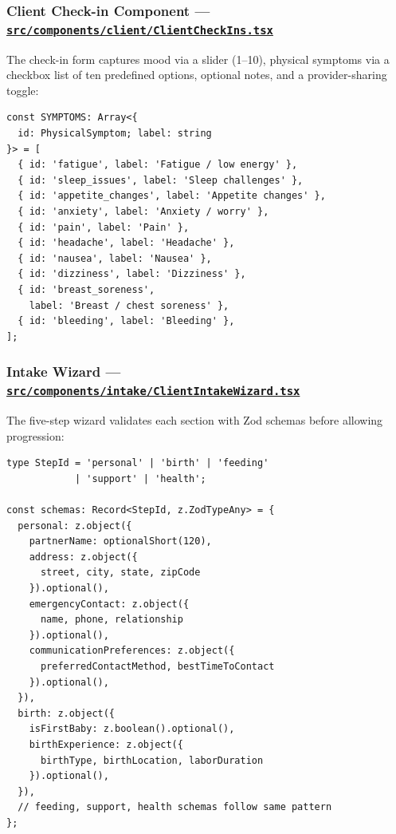 \documentclass[12pt,letterpaper]{article}
\newcommand{\ghrepo}{https://github.com/omniV1/lunaraCare}
\begin{document}
\subsubsection{Client Check-in Component --- \href{\ghrepo/blob/main/Lunara/src/components/client/ClientCheckIns.tsx}{\texttt{src/components/client/ClientCheckIns.tsx}}}

The check-in form captures mood via a slider (1--10), physical symptoms via a checkbox list of ten predefined options, optional notes, and a provider-sharing toggle:

\begin{lstlisting}[caption={Symptom definitions (\texttt{ClientCheckIns.tsx})}]
const SYMPTOMS: Array<{
  id: PhysicalSymptom; label: string
}> = [
  { id: 'fatigue', label: 'Fatigue / low energy' },
  { id: 'sleep_issues', label: 'Sleep challenges' },
  { id: 'appetite_changes', label: 'Appetite changes' },
  { id: 'anxiety', label: 'Anxiety / worry' },
  { id: 'pain', label: 'Pain' },
  { id: 'headache', label: 'Headache' },
  { id: 'nausea', label: 'Nausea' },
  { id: 'dizziness', label: 'Dizziness' },
  { id: 'breast_soreness',
    label: 'Breast / chest soreness' },
  { id: 'bleeding', label: 'Bleeding' },
];
\end{lstlisting}

\subsubsection{Intake Wizard --- \href{\ghrepo/blob/main/Lunara/src/components/intake/ClientIntakeWizard.tsx}{\texttt{src/components/intake/ClientIntakeWizard.tsx}}}

The five-step wizard validates each section with Zod schemas before allowing progression:

\begin{lstlisting}[caption={Intake wizard Zod validation schemas (\texttt{ClientIntakeWizard.tsx})}]
type StepId = 'personal' | 'birth' | 'feeding'
            | 'support' | 'health';

const schemas: Record<StepId, z.ZodTypeAny> = {
  personal: z.object({
    partnerName: optionalShort(120),
    address: z.object({
      street, city, state, zipCode
    }).optional(),
    emergencyContact: z.object({
      name, phone, relationship
    }).optional(),
    communicationPreferences: z.object({
      preferredContactMethod, bestTimeToContact
    }).optional(),
  }),
  birth: z.object({
    isFirstBaby: z.boolean().optional(),
    birthExperience: z.object({
      birthType, birthLocation, laborDuration
    }).optional(),
  }),
  // feeding, support, health schemas follow same pattern
};
\end{lstlisting}
\end{document}
